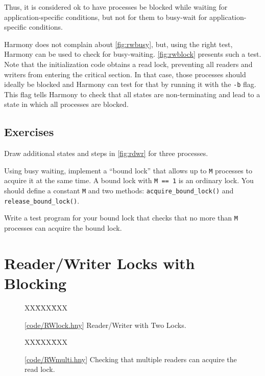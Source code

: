 \documentclass{report}
\newcommand{\harmonysource}[1]{
\begin{tabbing}
XX\=XXX\=XXX\kill
    
\end{tabbing}
}
\newcommand{\harmonylink}[1]{%
[\href{https://www.cs.cornell.edu/home/rvr/harmony/#1}{\underline{#1}}]%
}
\newenvironment{code}{
\tcolorbox
}{
\endtcolorbox
}
\begin{document}
Thus, it is considered ok to have processes be blocked while waiting
for application-specific conditions, but not for them to
busy-wait for application-specific conditions.

Harmony does not complain about \autoref{fig:rwbusy}, but, using
the right test, Harmony can be used to check for busy-waiting.
\autoref{fig:rwblock} presents such a test.
Note that the initialization code obtains a read lock, preventing
all readers and writers from entering the critical section.
In that case, those processes should ideally be blocked and Harmony
can test for that by running it with the \texttt{-b} flag.
This flag tells Harmony to check
that all states are non-terminating and lead to a state in which
all processes are blocked.

\section*{Exercises}
\begin{problems}
\item Draw additional states and steps in \autoref{fig:rdwr}
for three processes.
\item \label{ex:boundlock} Using busy waiting, implement a ``bound lock'' that allows
up to \texttt{M} processes to acquire it at the same time.  A bound lock
with \texttt{M == 1} is an ordinary lock.
You should define a constant \texttt{M} and two methods:
\texttt{acquire\_bound\_lock()}
and \texttt{release\_bound\_lock()}.
\item Write a test program for your bound lock
that checks that no more than \texttt{M} processes can acquire the
bound lock.
\end{problems}

\chapter{Reader/Writer Locks with Blocking}
\label{ch:rdwr2}

\begin{figure}
\begin{code}
\harmonysource{RWlock}
\end{code}
\caption{\harmonylink{code/RWlock.hny} Reader/Writer with Two Locks.}
\label{fig:rw2lock}
\end{figure}

\begin{figure}
\begin{code}
\harmonysource{RWmulti}
\end{code}
\caption{\harmonylink{code/RWmulti.hny} Checking that multiple readers can acquire the read lock.}
\label{fig:rwmulti}
\end{figure}
\end{document}
